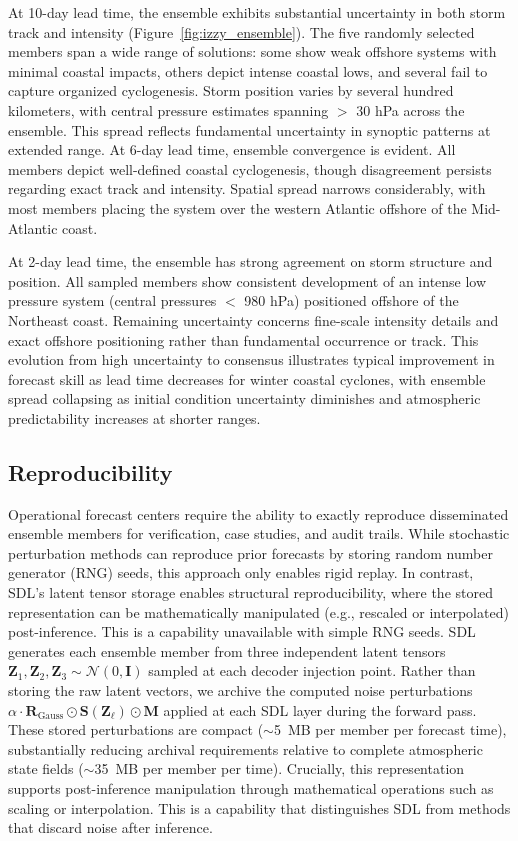 \documentclass{agujournal2019}
\begin{document}
At 10-day lead time, the ensemble exhibits substantial uncertainty in both storm track and intensity (Figure~\ref{fig:izzy_ensemble}). The five randomly selected members span a wide range of solutions: some show weak offshore systems with minimal coastal impacts, others depict intense coastal lows, and several fail to capture organized cyclogenesis. Storm position varies by several hundred kilometers, with central pressure estimates spanning $>$ 30 hPa across the ensemble. This spread reflects fundamental uncertainty in synoptic patterns at extended range. At 6-day lead time, ensemble convergence is evident. All members depict well-defined coastal cyclogenesis, though disagreement persists regarding exact track and intensity. Spatial spread narrows considerably, with most members placing the system over the western Atlantic offshore of the Mid-Atlantic coast.

At 2-day lead time, the ensemble has strong agreement on storm structure and position. All sampled members show consistent development of an intense low pressure system (central pressures $<$ 980 hPa) positioned offshore of the Northeast coast. Remaining uncertainty concerns fine-scale intensity details and exact offshore positioning rather than fundamental occurrence or track. This evolution from high uncertainty to consensus illustrates typical improvement in forecast skill as lead time decreases for winter coastal cyclones, with ensemble spread collapsing as initial condition uncertainty diminishes and atmospheric predictability increases at shorter ranges.

\subsection{Reproducibility}

Operational forecast centers require the ability to exactly reproduce disseminated
ensemble members for verification, case studies, and audit trails. While stochastic perturbation methods can reproduce prior forecasts by storing random number generator (RNG) seeds, this approach only enables rigid replay. In contrast, SDL's latent tensor storage enables structural reproducibility, where the stored representation can be mathematically manipulated (e.g., rescaled or interpolated) post-inference. This is a capability unavailable with simple RNG seeds. SDL generates each ensemble member from three independent latent tensors $\mathbf{Z}_1, \mathbf{Z}_2, \mathbf{Z}_3 \sim \mathcal{N}(0, \mathbf{I})$ sampled at each decoder injection point. Rather than storing the raw latent vectors, we archive the computed noise perturbations $\alpha \cdot \mathbf{R}_{\text{Gauss}} \odot \mathbf{S}(\mathbf{Z}_\ell) \odot \mathbf{M}$ applied at each SDL layer during the forward pass. These stored perturbations are compact ($\sim$5~MB per member per forecast time), substantially reducing archival requirements relative to complete atmospheric state fields ($\sim$35~MB per member per time). Crucially, this representation supports post-inference manipulation through mathematical operations such as scaling or interpolation. This is a capability that distinguishes SDL from methods that discard noise after inference. 
\end{document}
